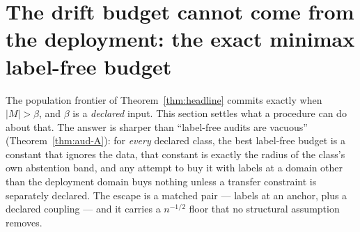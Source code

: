%
%
%
%

\providecommand{\E}{\mathbb{E}}
\providecommand{\Law}{\mathcal{L}}
\providecommand{\sign}{\operatorname{sign}}
\providecommand{\TV}{\mathrm{TV}}
\providecommand{\KL}{\mathrm{KL}}

\providecommand{\Var}{\operatorname{Var}}
\providecommand{\E}{\mathbb{E}}
\providecommand{\Law}{\mathcal{L}}
\providecommand{\sign}{\operatorname{sign}}
\providecommand{\TV}{\mathrm{TV}}
\providecommand{\KL}{\mathrm{KL}}
\providecommand{\R}{\mathbb{R}}

\section{The drift budget cannot come from the deployment: the exact minimax label-free budget}
\label{app:beta-impossible}

The population frontier of Theorem~\ref{thm:headline} commits exactly when $|M|>\beta$, and
$\beta$ is a \emph{declared} input. This section settles what a procedure can do about that.
The answer is sharper than ``label-free audits are vacuous''
(Theorem~\ref{thm:aud-A}): for \emph{every} declared class, the best label-free budget is a
constant that ignores the data, that constant is exactly the radius of the class's own
abstention band, and any attempt to buy it with labels at a domain other than the deployment
domain buys nothing unless a transfer constraint is separately declared. The escape is a
matched pair --- labels at an anchor, plus a declared coupling --- and it carries a
$n^{-1/2}$ floor that no structural assumption removes.

